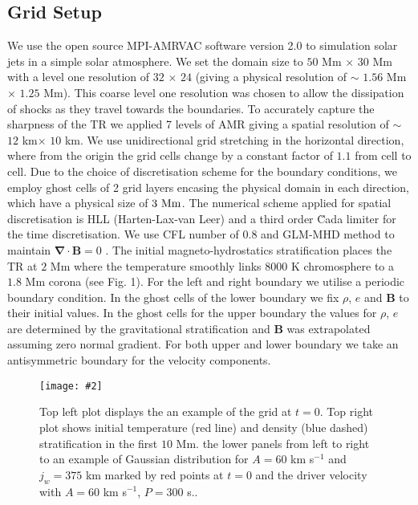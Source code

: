 \documentclass[12pt]{ociamthesis}
\newcommand{\bs}[1]{\boldsymbol{#1}}
\newcommand{\mfig}[4]{
  \begin{figure}
  \begin{center}
  \texttt{[image: \#2]}
  \caption{#3}
  \label{#4}
  \end{center}
  \end{figure}}
\begin{document}
\subsection{Grid Setup}
\label{sec:Grid_Setup}
We use the open source MPI-AMRVAC software version 2.0 \cite{Xia_2017} to simulation solar jets in a simple solar atmosphere. We set the domain size to $50$ Mm $\times$ $30$ Mm with a level one resolution of $32$ $\times$ $24$ (giving a physical resolution of $\sim$ $1.56$ Mm $\times$ $1.25$ Mm). This coarse level one resolution was chosen to allow the dissipation of shocks as they travel towards the boundaries. To accurately capture the sharpness of the TR we applied 7 levels of AMR giving a spatial resolution of $\sim$ $12$ km$\times$ $10$ km. We use unidirectional grid stretching in the horizontal direction, where from the origin the grid cells change by a constant factor of $1.1$ from cell to cell. Due to the choice of discretisation scheme for the boundary conditions, we employ ghost cells of 2 grid layers encasing the physical domain in each direction, which have a physical size of $3 \ \rm{Mm}$. The numerical scheme applied for spatial discretisation is HLL (Harten-Lax-van Leer) \cite{hll_1983} and a third order \u{C}ada limiter \citep{CADA20094118} for the time discretisation. We use CFL number of $0.8$ and GLM-MHD method to maintain $\bs{\nabla} \cdot \bs{B}=0$ \citep{DEDNER2002645}. The initial magneto-hydrostatics stratification places the TR at $2$ Mm where the temperature smoothly links $8000$ K chromosphere to a $1.8$ Mm corona (see Fig. 1). For the left and right boundary we utilise a periodic boundary condition. In the  ghost cells of the lower boundary we fix $\rho$, $e$ and $\bs{B}$ to their initial values. In the ghost cells for the upper boundary the values for $\rho$, $e$ are determined by the gravitational stratification and $\bs{B}$ was extrapolated assuming zero normal gradient. For both upper and lower boundary we take an antisymmetric boundary for the velocity components.
\mfig{1}{figures/numerical_Setup_lowres.png}{Top left plot displays the an example of the grid at $t=0$. Top right plot shows initial temperature (red line) and density (blue dashed) stratification in the first $10$ Mm. the lower panels from left to right to an example of Gaussian distribution for $A=60$ km s$^{-1}$ and $j_w=375$ km marked by red points at $t=0$ and the driver velocity with $A=60$ km s$^{-1}$, $P=300$ s..}{atoms_profile}
\end{document}
